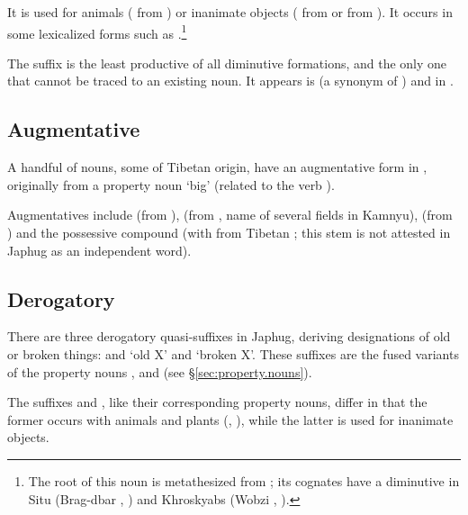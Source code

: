 It is used for animals ( from ) or inanimate objects ( from  or  from ). It occurs in some lexicalized forms such as .\footnote{The root of this noun is metathesized from ; its cognates have a  diminutive in Situ (Brag-dbar , \citealt[228]{zhang16bragdbar}) and Khroskyabs (Wobzi , \citealt[115]{lai17khroskyabs}).}

The suffix  is the least productive of all diminutive formations, and the only one that cannot be traced to an existing noun. It appears is  (a synonym of ) and in .
 
\subsection{Augmentative} \label{sec:augmentative}
A handful of nouns, some of Tibetan origin, have an augmentative form in , originally from a property noun  `big' (related to the verb ).

Augmentatives include  (from ),  (from , name of several fields in Kamnyu),  (from ) and the possessive compound  (with  from Tibetan ; this stem is not attested in Japhug as an independent word).

\subsection{Derogatory} \label{sec:derogatory}
There are three derogatory quasi-suffixes in Japhug, deriving designations of old or broken things:  and  `old X' and  `broken X'. These suffixes are the fused variants of the property nouns ,  and  (see §\ref{sec:property.nouns}). 

The suffixes  and , like their corresponding property nouns, differ in that the former occurs with animals and plants (, ), while the latter is used for inanimate objects.

